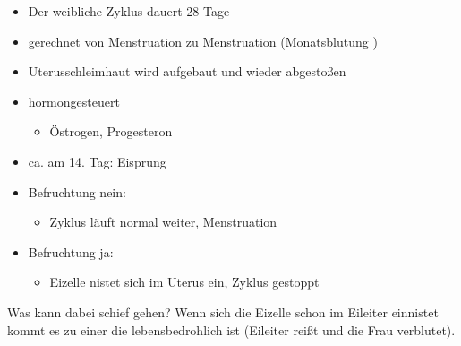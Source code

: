 \begin{itemize}
    \item Der weibliche Zyklus dauert 28 Tage
    \item gerechnet von Menstruation zu Menstruation  (Monatsblutung )
    \item Uterusschleimhaut wird aufgebaut und wieder abgestoßen
    \item hormongesteuert
    \begin{itemize}
        \item Östrogen, Progesteron
    \end{itemize}
    \item ca. am 14. Tag: Eisprung
    \item Befruchtung nein:
    \begin{itemize}
        \item Zyklus läuft normal weiter, Menstruation
    \end{itemize}
    \item Befruchtung ja:
    \begin{itemize}
        \item Eizelle nistet sich im Uterus ein, Zyklus gestoppt
    \end{itemize}
\end{itemize}

Was kann dabei schief gehen? Wenn sich die Eizelle schon im Ei\-leiter
einnistet kommt es zu einer
die lebens\-bedrohlich ist (Eileiter reißt und die Frau verblutet).

\begin{minipage}{\linewidth}


\end{minipage}



